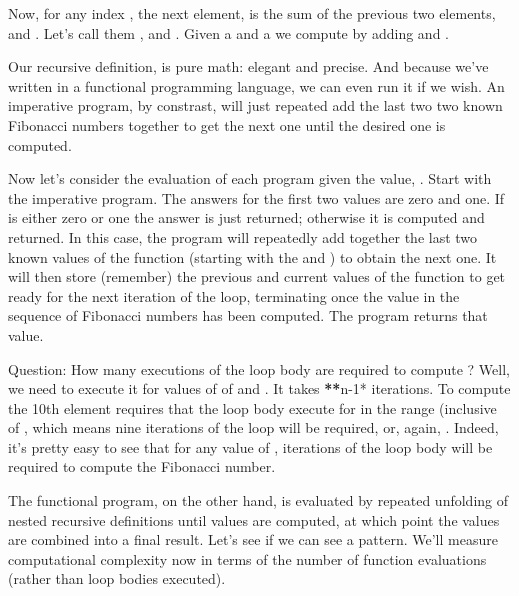 \documentclass[letterpaper,10pt,english]{sphinxmanual}
\begin{document}
Now, for any index , the next element,  is the sum
of the previous two elements,  and . Let’s call them
, and . Given a  and
a  we compute  by adding  and .

Our recursive definition,  is pure math: elegant and precise.
And because we’ve written in a functional programming language, we can
even run it if we wish. An imperative program, by constrast, will just
repeated add the last two two known Fibonacci numbers together to get
the next one until the desired  one is computed.

Now let’s consider the evaluation of each program given the value, . Start with the imperative program. The answers for the first two
values are zero and one. If  is either zero or one the answer is
just returned; otherwise it is computed and returned. In this case,
the program will repeatedly add together the last two known values of
the function (starting with the  and ) to obtain the next one.
It will then store (remember) the previous and current values of the
function to get ready for the next iteration of the loop, terminating
once the  value in the sequence of Fibonacci numbers has been
computed. The program returns that value.

Question: How many executions of the loop body are required to compute
? Well, we need to execute it for values of  of 
and . It takes  {\color{red}\bfseries{}**}n-1* iterations. To compute the 10th element
requires that the loop body execute for  in the range (inclusive
of \sphinxstyleemphasis{{[}2, 3, …, 10{]}}, which means nine iterations of the loop will be
required, or, again, . Indeed, it’s pretty easy to see that for
any value of ,  iterations of the loop body will be required
to compute the  Fibonacci number.

The functional program, on the other hand, is evaluated by repeated
unfolding of nested recursive definitions until values are computed,
at which point the values are combined into a final result. Let’s see
if we can see a pattern. We’ll measure computational complexity now in
terms of the number of function evaluations (rather than loop bodies
executed).
\end{document}
